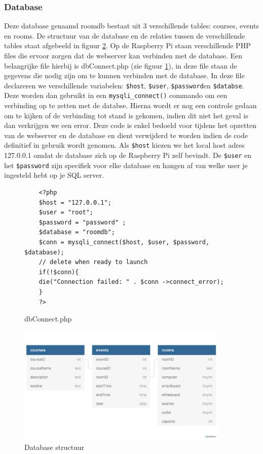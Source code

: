 \documentclass[a4paper,kul]{kulakarticle} %
\begin{document}
\subsubsection{Database}
Deze database genaamd roomdb bestaat uit 3 verschillende tables: courses, events en rooms. De structuur van de database en de relaties tussen de verschillende tables staat afgebeeld in figuur \ref{fig:dbstruct}. Op de Raspberry Pi staan verschillende PHP files die ervoor zorgen dat de webserver kan verbinden met de database. Een belangrijke file hierbij is dbConnect.php (zie figuur \ref{fig:dbconnect}), in deze file staan de gegevens die nodig zijn om te kunnen verbinden met de database. In deze  file declareren we verschillende variabelen: \verb|$host|, \verb|$user|, \verb|$password|en \verb|$databse|. Deze worden dan gebruikt in een \verb|mysqli_connect()| commando om een verbinding op te zetten met de databse. Hierna wordt er nog een controle gedaan om te kijken of de verbinding tot stand is gekomen, indien dit niet het geval is dan verkrijgen we een error. Deze code is enkel bedoeld voor tijdens het opzetten van de webserver en de database en dient verwijderd te worden indien de code definitief in gebruik wordt genomen. Als \verb|$host| kiezen we het local host adres 127.0.0.1 omdat de database zich op de Raspberry Pi zelf bevindt. De \verb|$user| en het \verb|$password| zijn specifiek voor elke database en hangen af van welke user je ingesteld hebt op je SQL server. 
\begin{figure}[h]
	\begin{verbatim}
	<?php
	$host = "127.0.0.1";
	$user = "root";
	$password = "password" ;
	$database = "roomdb";
	$conn = mysqli_connect($host, $user, $password, $database);
	// delete when ready to launch
	if(!$conn){
	die("Connection failed: " . $conn ->connect_error);
	}
	?>
	\end{verbatim}
	\caption{dbConnect.php}
	\label{fig:dbconnect}
\end{figure}
\begin{figure}[h]
	\includegraphics[width=0.9\textwidth]{dbstruct}
	\caption{Database structuur}
	\label{fig:dbstruct}
\end{figure}
\end{document}
